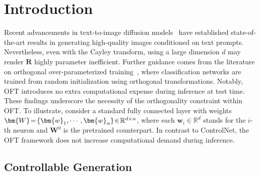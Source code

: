{\section{Introduction}

Recent advancements in text-to-image diffusion models~\cite{saharia2022photorealistic,ramesh2022hierarchical,rombach2022high} have established state-of-the-art results in generating high-quality images conditioned on text prompts. Nevertheless, even with the Cayley transform, using a large dimension $d$ may render $\bm{R}$ highly parameter inefficient. Further guidance comes from the literature on orthogonal over-parameterized training~\cite{liu2021orthogonal}, where classification networks are trained from random initialization using orthogonal transformations. Notably, OFT introduces no extra computational expense during inference at test time. These findings underscore the necessity of the orthogonality constraint within OFT. To illustrate, consider a standard fully connected layer with weights $\thickmuskip=2mu \medmuskip=2mu \bm{W}=\{\bm{w}_1,\cdots,\bm{w}_n\}\in\mathbb{R}^{d\times n}$, where each $\bm{w}_i\in\mathbb{R}^{d}$ stands for the $i$-th neuron and $\bm{W}^0$ is the pretrained counterpart. In contrast to ControlNet, the OFT framework does not increase computational demand during inference. \subsection{Controllable Generation}

}

